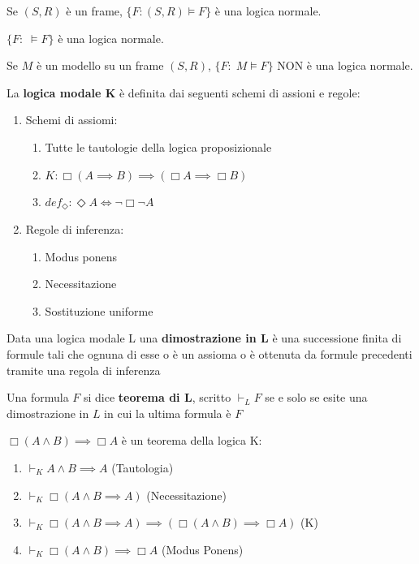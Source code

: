 \documentclass[10pt,a4paper,twoside]{book}
\begin{document}
\begin{example}
    Se $(S,R)$ è un frame, $\{F: (S,R) \vDash F\}$ è una logica normale.
\end{example}
\begin{example}
    $\{F: \; \vDash F\}$ è una logica normale.
\end{example}
\begin{example}
    Se $M$ è un modello su un frame $(S,R)$, $\{F: \; M \vDash F\}$ NON è una logica normale.
\end{example}
\begin{definition}
    La \textbf{logica modale K} è definita dai seguenti schemi di assioni e regole:
    \begin{enumerate}
        \item Schemi di assiomi:
              \begin{enumerate}
                  \item Tutte le tautologie della logica proposizionale
                  \item $K: \Box (A \implies B) \implies (\Box A \implies \Box B)$
                  \item $def_\Diamond : \Diamond A \iff \neg \Box \neg A$
              \end{enumerate}
        \item Regole di inferenza:
              \begin{enumerate}
                  \item Modus ponens
                  \item Necessitazione
                  \item Sostituzione uniforme
              \end{enumerate}
    \end{enumerate}
\end{definition}
\begin{definition}
    Data una logica modale L una \textbf{dimostrazione in L} è una successione finita di formule tali che ognuna di esse o è un assioma o è ottenuta da formule precedenti tramite una regola di inferenza
\end{definition}
\begin{definition}
    Una formula $F$ si dice \textbf{teorema di L}, scritto $\vdash_L F$ se e solo se esite una dimostrazione in $L$ in cui la ultima formula è $F$
\end{definition}
\begin{example}
    $\Box (A \land B) \implies \Box A$ è un teorema della logica K:
    \begin{enumerate}
        \item $\vdash_K A \land B \implies A$ (Tautologia)
        \item $\vdash_K \Box (A \land B \implies A)$ (Necessitazione)
        \item $\vdash_K \Box (A \land B \implies A ) \implies (\Box (A \land B ) \implies \Box A)$ (K)
        \item $\vdash_K \Box (A \land B ) \implies \Box A$ (Modus Ponens)
    \end{enumerate}
\end{example}
\end{document}
